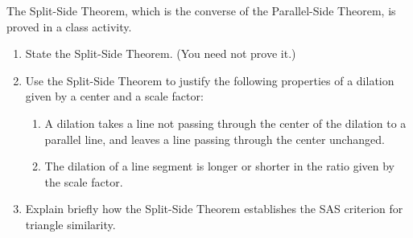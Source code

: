 \begin{prob}
The Split-Side Theorem, which is the converse of the Parallel-Side Theorem, is proved in a class activity.   
\begin{enumerate}
\item State the Split-Side Theorem.   (You need not prove it.)
\item Use the Split-Side Theorem to justify the following properties of a dilation given by a center and a scale factor:
\begin{enumerate}
\item A dilation takes a line not passing through the center of the dilation to a parallel line, and leaves a line passing through the center unchanged.
\item The dilation of a line segment is longer or shorter in the ratio given by the scale factor.
\end{enumerate}
\item Explain briefly how the Split-Side Theorem establishes the SAS criterion for triangle similarity.  
\end{enumerate}
\end{prob}

